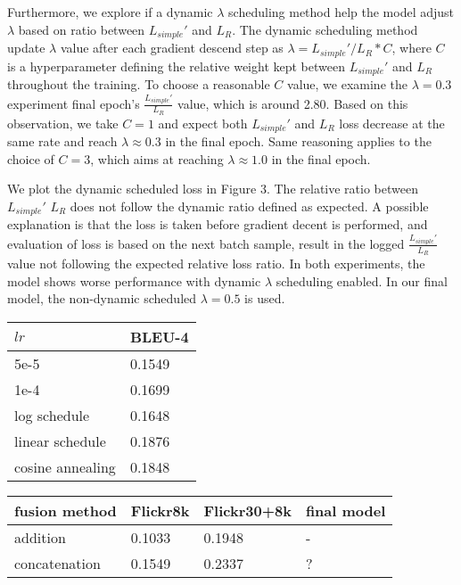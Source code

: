 \documentclass{article}
\begin{document}
Furthermore, we explore if a dynamic $\lambda$ scheduling method help the model adjust $\lambda$ based on ratio between $L_{simple}'$ and $L_R$. The dynamic scheduling method update $\lambda$ value after each gradient descend step as $\lambda = L_{simple}' / L_R * C$, where $C$ is a hyperparameter defining the relative weight kept between $L_{simple}'$ and $L_R$ throughout the training. To choose a reasonable $C$ value, we examine the $\lambda = 0.3$ experiment final epoch's $\frac{L_{simple}'}{L_R}$ value, which is around 2.80. Based on this observation, we take $C = 1$ and expect both $L_{simple}'$ and $L_R$ loss decrease at the same rate and reach $\lambda \approx 0.3$ in the final epoch. Same reasoning applies to the choice of $C = 3$, which aims at reaching $\lambda \approx 1.0$ in the final epoch. 

We plot the dynamic scheduled loss in Figure 3. The relative ratio between $L_{simple}'$ $L_R$ does not follow the dynamic ratio defined as expected. A possible explanation is that the loss is taken before gradient decent is performed, and evaluation of loss is based on the next batch sample, result in the logged $\frac{L_{simple}'}{L_R}$ value not following the expected relative loss ratio. In both experiments, the model shows worse performance with dynamic $\lambda$ scheduling enabled. In our final model, the non-dynamic scheduled $\lambda = 0.5$ is used.

\begin{minipage}[c]{0.5\textwidth}
\centering
\begin{tabular}{ll}
\toprule
$lr$ & BLEU-4 \\
\midrule
5e-5 & 0.1549 \\
1e-4 & 0.1699  \\
log schedule & 0.1648 \\
linear schedule & 0.1876 \\
cosine annealing & 0.1848
\bottomrule
\end{tabular}
\label{tab:lr}
\end{minipage}
\begin{minipage}[c]{0.5\textwidth}
\centering
\begin{tabular}{llll}
\toprule
fusion method & Flickr8k & Flickr30+8k & final model \\
\midrule
addition & 0.1033 & 0.1948 & - \\
concatenation & 0.1549 & 0.2337 & ?
\bottomrule
\end{tabular}
\label{tab:fusion}
\end{minipage}
\end{document}
